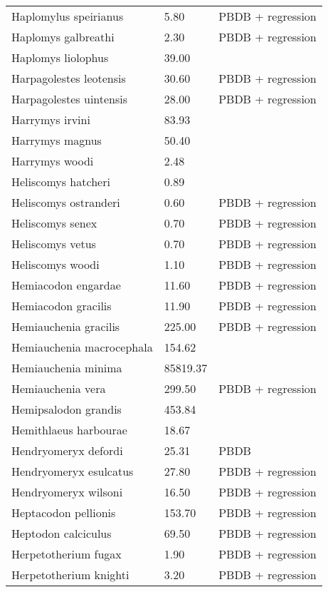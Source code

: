 \documentclass{article}
\begin{document}
\begin{center}
\begin{longtable}{p{} p{} p{}}
    Haplomylus speirianus & 5.80 & PBDB + regression \\ 
    Haplomys galbreathi & 2.30 & PBDB + regression \\ 
    Haplomys liolophus & 39.00 & \cite{McKenna2011} \\ 
    Harpagolestes leotensis & 30.60 & PBDB + regression \\ 
    Harpagolestes uintensis & 28.00 & PBDB + regression \\ 
    Harrymys irvini & 83.93 & \cite{Tomiya2013} \\ 
    Harrymys magnus & 50.40 & \cite{Tomiya2013} \\ 
    Harrymys woodi & 2.48 & \cite{Kirk2011} \\ 
    Heliscomys hatcheri & 0.89 & \cite{Wilson2012} \\ 
    Heliscomys ostranderi & 0.60 & PBDB + regression \\ 
    Heliscomys senex & 0.70 & PBDB + regression \\ 
    Heliscomys vetus & 0.70 & PBDB + regression \\ 
    Heliscomys woodi & 1.10 & PBDB + regression \\ 
    Hemiacodon engardae & 11.60 & PBDB + regression \\ 
    Hemiacodon gracilis & 11.90 & PBDB + regression \\ 
    Hemiauchenia gracilis & 225.00 & PBDB + regression \\ 
    Hemiauchenia macrocephala & 154.62 & \cite{Smith2004} \\ 
    Hemiauchenia minima & 85819.37 & \cite{Tomiya2013} \\ 
    Hemiauchenia vera & 299.50 & PBDB + regression \\ 
    Hemipsalodon grandis & 453.84 & \cite{Scott1937} \\ 
    Hemithlaeus harbourae & 18.67 & \cite{Loomis1932} \\ 
    Hendryomeryx defordi & 25.31 & PBDB \\ 
    Hendryomeryx esulcatus & 27.80 & PBDB + regression \\ 
    Hendryomeryx wilsoni & 16.50 & PBDB + regression \\ 
    Heptacodon pellionis & 153.70 & PBDB + regression \\ 
    Heptodon calciculus & 69.50 & PBDB + regression \\ 
    Herpetotherium fugax & 1.90 & PBDB + regression \\ 
    Herpetotherium knighti & 3.20 & PBDB + regression \\ 

\end{longtable}
\end{center}
\end{document}
